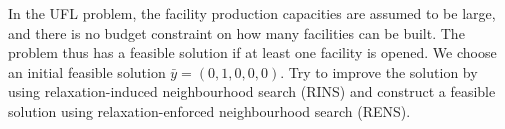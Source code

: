 \begin{itemize}
	In the UFL problem, the facility production capacities are assumed to be large, and there is no budget constraint on how many facilities can be built. The problem thus has a feasible solution if at least one facility is opened. We choose an initial feasible solution $\bar{y} = (0,1,0,0,0)$. Try to improve the solution by using relaxation-induced neighbourhood search (RINS) and construct a feasible solution using relaxation-enforced neighbourhood search (RENS). 
\end{itemize}
